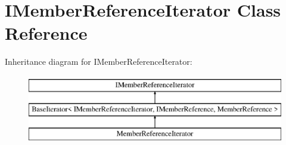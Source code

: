 \hypertarget{class_i_member_reference_iterator}{}\section{I\+Member\+Reference\+Iterator Class Reference}
\label{class_i_member_reference_iterator}
Inheritance diagram for I\+Member\+Reference\+Iterator\+:\begin{figure}[H]
\begin{center}
\leavevmode
\includegraphics[height=3.000000cm]{class_i_member_reference_iterator}
\end{center}
\end{figure}

